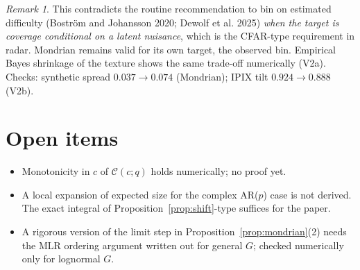\documentclass[11pt]{article}
\theoremstyle{remark}\newtheorem{remark}{Remark}
\begin{document}
\begin{remark}
This contradicts the routine recommendation to bin on estimated difficulty (Bostr\"om and Johansson 2020; Dewolf et al. 2025) \emph{when the target is coverage conditional on a latent nuisance}, which is the CFAR-type requirement in radar. Mondrian remains valid for its own target, the observed bin. Empirical Bayes shrinkage of the texture shows the same trade-off numerically (V2a). Checks: synthetic spread $0.037\to0.074$ (Mondrian); IPIX tilt $0.924\to0.888$ (V2b).
\end{remark}

\section{Open items}
\begin{itemize}
\item Monotonicity in $c$ of $\mathcal C(c;q)$ holds numerically; no proof yet.
\item A local expansion of expected size for the complex AR($p$) case is not derived. The exact integral of Proposition~\ref{prop:shift}-type suffices for the paper.
\item A rigorous version of the limit step in Proposition~\ref{prop:mondrian}(2) needs the MLR ordering argument written out for general $G$; checked numerically only for lognormal $G$.
\end{itemize}
\end{document}

